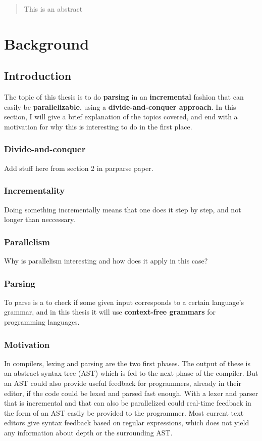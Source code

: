 \documentclass[a4paper,12pt,twosided]{report}
\begin{document}


\begin{abstract}
This is an abstract
\end{abstract}

\tableofcontents

%
%

\chapter{Background}

\section{Introduction}
The topic of this thesis is to do \textbf{parsing} in an \textbf{incremental}
fashion that can easily be \textbf{parallelizable}, using a
\textbf{divide-and-conquer approach}. In this section, I will give a brief
explanation of the topics covered, and end with a motivation for why this is
interesting to do in the first place.

\subsection{Divide-and-conquer}
Add stuff here from section 2 in parparse paper.

\subsection{Incrementality}
Doing something incrementally means that one does it step by step, and not
longer than neccessary.

\subsection{Parallelism}
Why is parallelism interesting and how does it apply in this case?

\subsection{Parsing}
To parse is a to check if some given input corresponds to a certain language's
grammar, and in this thesis it will use \textbf{context-free grammars} for
programming languages.

\subsection{Motivation}
In compilers, lexing and parsing are the two first phases. The output of these
is an abstract syntax tree (AST) which is fed to the next phase of the compiler.
But an AST could also provide useful feedback for programmers, already in their
editor, if the code could be lexed and parsed fast enough. With a lexer and
parser that is incremental and that can also be parallelized could real-time
feedback in the form of an AST easily be provided to the programmer. Most
current text editors give syntax feedback based on regular expressions, which
does not yield any information about depth or the surrounding AST.
\end{document}
